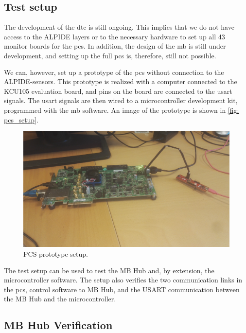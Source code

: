 \documentclass[main.tex]{subfiles}
\begin{document}
\subsection{Test setup}
\label{ssec: test_setup}

The development of the \gls{dtc} is still ongoing. This implies that we do not have access to the ALPIDE layers or to the necessary hardware to set up all 43 monitor boards for the \gls{pcs}. In addition, the design of the \gls{mb} is still under development, and setting up the full \gls{pcs} is, therefore, still not possible.

We can, however, set up a prototype of the \gls{pcs} without connection to the ALPIDE-sensors. This prototype is realized with a computer connected to the KCU105 evaluation board, and pins on the board are connected to the \gls{usart} signals. The \gls{usart} signals are then wired to a microcontroller development kit, programmed with the \gls{mb} software. An image of the prototype is shown in \autoref{fig: pcs_setup}.

\begin{figure}[!htpb]
    \centering
    \includegraphics[width=14cm]{images/pcs_setup.jpg}
    \caption{PCS prototype setup.}
    \label{fig: pcs_setup}
\end{figure}
\FloatBarrier

The test setup can be used to test the MB Hub and, by extension, the microcontroller software. The setup also verifies the two communication links in the \gls{pcs}, control software to MB Hub, and the USART communication between the MB Hub and the microcontroller.



\subsection{MB Hub Verification}
\end{document}
